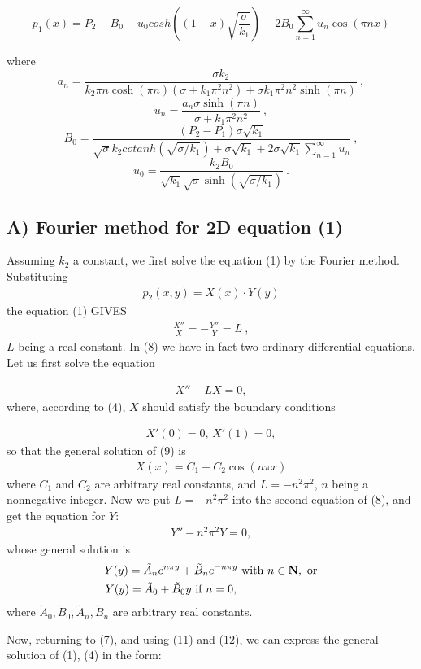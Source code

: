 \documentclass[times]{nlaauth}%
\begin{document}
\[
 p_1(x) = P_2-B_0 -u_0 cosh((1-x)\sqrt{\frac{\sigma}{k_1}}) -2 B_0 \sum_{n=1}^\infty  u_n \cos(\pi n x) 
\]

where
\[
  a_n = \frac{\sigma k_2}{ k_2 \pi n \cosh(\pi n) (\sigma + k_1 \pi^2 n^2) 
+ \sigma k_1 \pi^2 n^2 \sinh(\pi n)} \ , 
\]
\[
  u_n = \frac{a_n \sigma \sinh(\pi n)}{\sigma + k_1 \pi^2 n^2} \ , 
\]
\[
 B_0 = \frac{(P_2-P_1) \sigma \sqrt{k_1} } {\sqrt{\sigma} k_2 cotanh(\sqrt{\sigma / k_1})
             + \sigma \sqrt{k_1} + 2 \sigma \sqrt{k_1} \sum_{n=1}^{\infty} u_n} \ ,
\]
\[
 u_0 = \frac{k_2 B_0}{ \sqrt{k_1} \sqrt{ \sigma} \sinh(\sqrt{\sigma / k_1})} \ .
\]

\subsection{\bf A) Fourier method for 2D equation (1)}
\par
Assuming $k_2$ a constant, we first solve the equation (1) by the Fourier method. Substituting 
\begin {gather}
p_2(x,y) = X(x)\cdot Y(y) 
\end {gather}
the equation (1) GIVES
\begin {gather}
\frac{X''}{X} = -\frac{Y''}{Y} = L\ ,
\end {gather}
$L$ being a real constant. In (8) we have in fact two ordinary differential equations. 
Let us first solve the equation

\begin {gather}
X'' - L X = 0,
\end {gather}
where, according to (4), $X$ should satisfy the boundary conditions

\begin {gather}
X'(0) = 0, \, X'(1) = 0, \nonumber
\end {gather}
so that the general solution of (9) is 
\begin {gather}
X(x) = C_1 + C_2 \cos (n\pi x)
\end {gather}
where $C_1$ and $C_2$ are arbitrary real constants, and 
$L= - n^2 \pi^2 $, $n$ being a nonnegative integer.
Now we put $L= - n^2 \pi^2 $ into the second equation of (8), and get the equation for $Y$:
\begin {gather}
Y'' - n^2\pi^2 Y = 0,
\end {gather}
whose general solution is 
\begin{eqnarray}
Y(y)= \tilde A_n e^{n\pi y}+ \tilde B_n e^{-n\pi y} \mbox{\ with\ } n \in {\bf {N}}, \ \mbox{or}\\
Y(y) = \tilde A_0 + \tilde B_0 y \mbox{\ if\ } n = 0, \hspace {25mm} \nonumber
\end{eqnarray}
where $\tilde A_0, \tilde B_0, \tilde A_n, \tilde B_n$ are arbitrary real constants.
\par
Now, returning to (7), and using (11) and (12), we can express the general solution of (1), (4) in the form:
\end{document}
